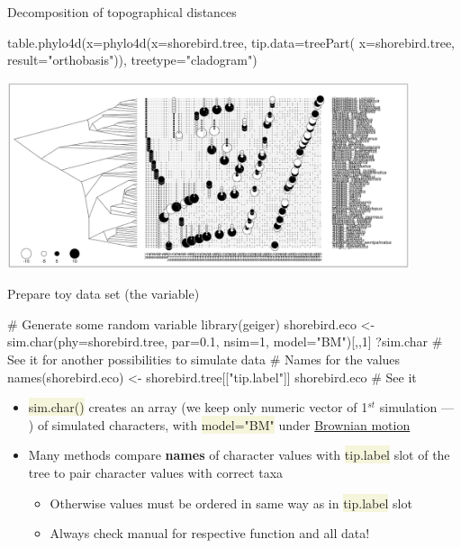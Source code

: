 \documentclass[compress, ucs, xelatex, 11pt, xcolor=svgnames, aspectratio=169,
	hyperref={
		bookmarks=true,
		unicode=true,
		colorlinks=true,
		pdftitle={Molecular data in R},
		plainpages=false,
		pdfauthor={Vojtech Zeisek},
		pdfsubject={Course about phylogeny and evolution in R},
		pdfcreator={XeLaTeX},
		pdfkeywords={R, evolution, phylogeny, molecular data},
		linkcolor=Crimson, %
		anchorcolor=Magenta, %
		citecolor=Magenta, %
		filecolor=Magenta, %
		menucolor=Magenta, %
		urlcolor=DodgerBlue, %
		pdftex},
	url={hyphens, lowtilde} %
	]{beamer}
\renewcommand{\texttt}[1]{\colorbox{Beige}{{\ttfamily #1}}}
\begin{document}
\begin{frame}[fragile]{Decomposition of topographical distances}
	\begin{spluscode}
    table.phylo4d(x=phylo4d(x=shorebird.tree, tip.data=treePart(
      x=shorebird.tree, result="orthobasis")), treetype="cladogram")
	\end{spluscode}
	\begin{center}
		\includegraphics[height=5.5cm]{shorebird_tree_decomp.png}
	\end{center}
\end{frame}

\begin{frame}[fragile]{Prepare toy data set (the variable)}
	\begin{spluscode}
    # Generate some random variable
    library(geiger)
    shorebird.eco <- sim.char(phy=shorebird.tree, par=0.1, nsim=1,
      model="BM")[,,1]
    ?sim.char # See it for another possibilities to simulate data
    # Names for the values
    names(shorebird.eco) <- shorebird.tree[["tip.label"]]
    shorebird.eco # See it
	\end{spluscode}
	\begin{itemize}
		\item \texttt{sim.char()} creates an array (we keep only numeric vector of 1$^{st}$ simulation --- \texttt{[,,1]}) of simulated characters, with \texttt{model="BM"} under \href{https://en.wikipedia.org/wiki/Brownian_motion}{Brownian motion}
		\item Many methods compare \textbf{names} of character values with \texttt{tip.label} slot of the tree to pair character values with correct taxa
		\begin{itemize}
			\item Otherwise values must be ordered in same way as in \texttt{tip.label} slot
			\item \alert{Always check manual for respective function and all data!}
		\end{itemize}
	\end{itemize}
\end{frame}
\end{document}
